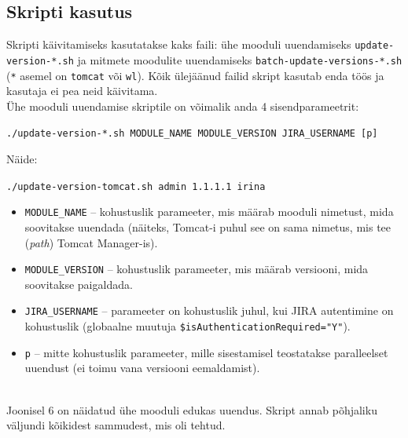 \documentclass[12pt]{report}
\newcommand{\code}[1]{\texttt{#1}}
\begin{document}
  \subsection{Skripti kasutus}
  
  Skripti käivitamiseks kasutatakse kaks faili: ühe mooduli uuendamiseks \code{update-version-*.sh} ja mitmete moodulite uuendamiseks \code{batch-update-versions-*.sh} (\code{*} asemel on \code{tomcat} või \code{wl}). Kõik ülejäänud failid skript kasutab enda töös ja kasutaja ei pea neid käivitama.\\
  
  Ühe mooduli uuendamise skriptile on võimalik anda 4 sisendparameetrit:
  \begin{center}
    \small{\code{./update-version-*.sh MODULE\_NAME MODULE\_VERSION JIRA\_USERNAME [p]}}
  \end{center}
  
  Näide:
  \begin{center}
    \small{\code{./update-version-tomcat.sh admin 1.1.1.1 irina}}
  \end{center}

  \begin{itemize}
    \item \code{MODULE\_NAME} \--- kohustuslik parameeter, mis määrab mooduli nimetust, mida soovitakse uuendada (näiteks, Tomcat-i puhul see on sama nimetus, mis tee (\textit{path}) Tomcat Manager-is).
    \item \code{MODULE\_VERSION} \--- kohustuslik parameeter, mis määrab versiooni, mida soovitakse paigaldada.
    \item \code{JIRA\_USERNAME} \--- parameeter on kohustuslik juhul, kui JIRA autentimine on kohustuslik (globaalne muutuja \code{\$isAuthenticationRequired="Y"}).
    \item \code{p} \--- mitte kohustuslik parameeter, mille sisestamisel teostatakse paralleelset uuendust (ei toimu vana versiooni eemaldamist).
  \end{itemize}\\
  
  Joonisel 6 on näidatud ühe mooduli edukas uuendus. Skript annab põhjaliku väljundi kõikidest sammudest, mis oli tehtud.
  
\end{document}

